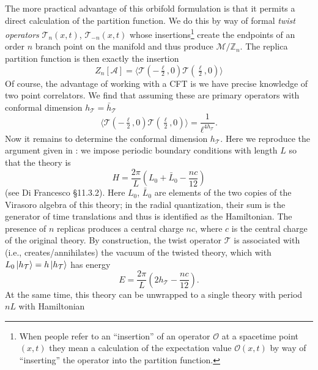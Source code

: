 \documentclass{report}
\begin{document}
The more practical advantage of this orbifold formulation is that it permits a 
direct calculation of the partition function. We do this by way of formal 
\textit{twist operators} $ \mathcal{T}_n(x,t) $, $ \mathcal{T}_{-n}(x,t) $ whose
insertions\footnote{When people refer to an ``insertion'' of an operator 
$ \mathcal{O} $ at a spacetime point $ (x,t) $ they mean a calculation of the
expectation value $ \mathcal{O}(x,t) $ by way of ``inserting'' the operator 
into the partition function.} create the endpoints of an order $ n $
branch point on the manifold and thus produce $ \mathcal{M}/\mathbb{Z}_n $. 
The replica partition function is then exactly the insertion 
\begin{equation*}
	Z_n[\mathcal{A}]
		= \langle \mathcal{T}(-\tfrac{\ell}{2}, 0) \mathcal{T}(\tfrac{\ell}{2}, 0) \rangle
\end{equation*}
Of course, the advantage of working with a CFT is we have precise knowledge of 
two point correlators. We find that assuming these are primary operators with 
conformal dimension $ h_{\mathcal{T}}=\bar{h}_{\mathcal{T}} $
\begin{equation*}
	\langle \mathcal{T}(-\tfrac{\ell}{2}, 0) \mathcal{T}(\tfrac{\ell}{2}, 0) \rangle
		= \frac{1}{\ell^{4h_{\mathcal{T}}}}.
\end{equation*}
Now it remains to determine the conformal dimension $ h_{\mathcal{T}} $. Here we reproduce the 
argument given in : we impose periodic boundary conditions with 
length $ L $ so that the theory is
\begin{equation*}
	H = \frac{2\pi}{L} \left(L_0 + \bar{L}_0 - \frac{nc}{12}\right)
\end{equation*} 
(see Di Francesco \S11.3.2). Here $ L_0 $, $ \bar{L}_0 $ are elements of the 
two copies of the Virasoro algebra of this theory; in the radial quantization, 
their sum is the generator of time translations and thus is identified as 
the Hamiltonian. The presence of $ n $ replicas produces a central charge 
$ nc $, where $ c $ is the central charge of the original theory. By construction, 
the twist operator $ \mathcal{T} $ is associated with (i.e.,
creates/annihilates) the vacuum of the twisted theory, which with $ L_0
\ket{h_{\mathcal{T}}} = h\ket{h_{\mathcal{T}}} $
has energy 
\begin{equation*}
	E = \frac{2\pi}{L} \left(2 h_{\mathcal{T}} - \frac{nc}{12}\right).
\end{equation*}
At the same time, this theory can be unwrapped to a single theory with period $
nL $ with Hamiltonian 
\end{document}
